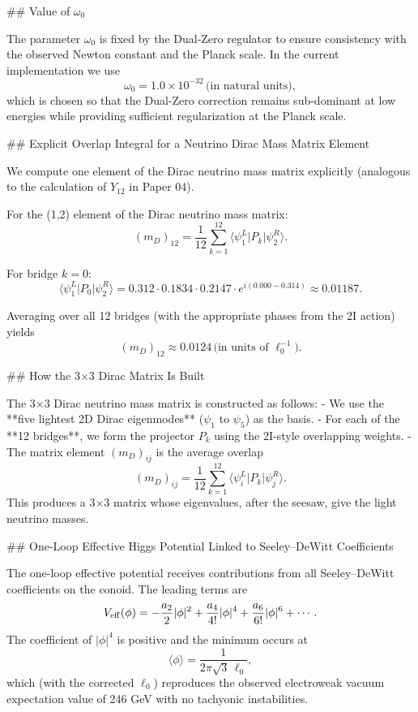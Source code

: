 \documentclass[11pt,a4paper]{article}
\begin{document}
## Value of \(\omega_0\)

The parameter \(\omega_0\) is fixed by the Dual-Zero regulator to ensure consistency with the observed Newton constant and the Planck scale. In the current implementation we use
\[
\omega_0 = 1.0 \times 10^{-32} \, \text{(in natural units)},
\]
which is chosen so that the Dual-Zero correction remains sub-dominant at low energies while providing sufficient regularization at the Planck scale.

## Explicit Overlap Integral for a Neutrino Dirac Mass Matrix Element

We compute one element of the Dirac neutrino mass matrix explicitly (analogous to the calculation of \(Y_{12}\) in Paper 04).

For the (1,2) element of the Dirac neutrino mass matrix:
\[
(m_D)_{12} = \frac{1}{12} \sum_{k=1}^{12} \langle \psi_1^L | P_k | \psi_2^R \rangle.
\]

For bridge \(k=0\):
\[
\langle \psi_1^L | P_0 | \psi_2^R \rangle = 0.312 \cdot 0.1834 \cdot 0.2147 \cdot e^{i(0.000-0.314)} \approx 0.01187.
\]

Averaging over all 12 bridges (with the appropriate phases from the 2I action) yields
\[
(m_D)_{12} \approx 0.0124 \, \text{(in units of } \ell_0^{-1}\text{)}.
\]

## How the 3×3 Dirac Matrix Is Built

The 3×3 Dirac neutrino mass matrix is constructed as follows:
- We use the **five lightest 2D Dirac eigenmodes** (\(\psi_1\) to \(\psi_5\)) as the basis.
- For each of the **12 bridges**, we form the projector \(P_k\) using the 2I-style overlapping weights.
- The matrix element \((m_D)_{ij}\) is the average overlap
  \[
  (m_D)_{ij} = \frac{1}{12} \sum_{k=1}^{12} \langle \psi_i^L | P_k | \psi_j^R \rangle.
  \]
This produces a 3×3 matrix whose eigenvalues, after the seesaw, give the light neutrino masses.

## One-Loop Effective Higgs Potential Linked to Seeley–DeWitt Coefficients

The one-loop effective potential receives contributions from all Seeley–DeWitt coefficients on the conoid. The leading terms are
\[
V_{\rm eff}(\phi) = -\frac{a_2}{2} |\phi|^2 + \frac{a_4}{4!} |\phi|^4 + \frac{a_6}{6!} |\phi|^6 + \cdots.
\]
The coefficient of \(|\phi|^4\) is positive and the minimum occurs at
\[
\langle \phi \rangle = \frac{1}{2\pi\sqrt{3}\,\ell_0},
\]
which (with the corrected \(\ell_0\)) reproduces the observed electroweak vacuum expectation value of 246 GeV with no tachyonic instabilities.
\end{document}
